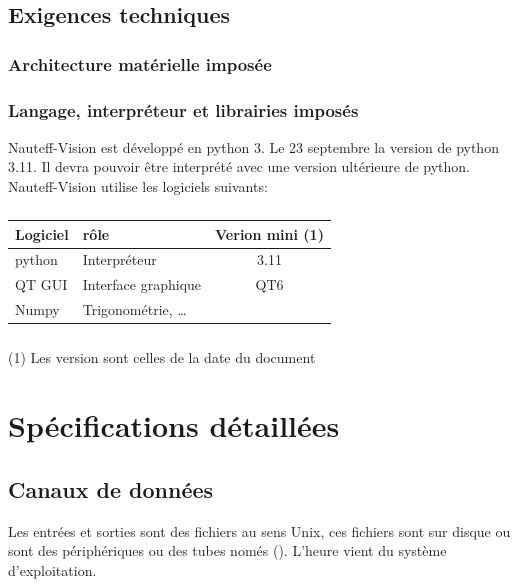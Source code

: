 \documentclass[a4paper,11pt]{report}
\begin{document}
\section{Exigences techniques}
\subsection{Architecture matérielle imposée}
\subsection{Langage, interpréteur et librairies imposés}
Nauteff-Vision est développé en python 3.
Le 23 septembre la version de python 3.11.
Il devra pouvoir être interprété
avec une version ultérieure de python. 
Nauteff-Vision utilise les logiciels suivants:
\paragraph{}

\begin{tabular}{l|l|c}
        Logiciel & rôle & Verion mini (1)\\
        \hline
        python & Interpréteur & 3.11 \\
        QT GUI & Interface graphique & QT6\\
        Numpy & Trigonométrie, \ldots   & \\
\end{tabular}
\paragraph{}

(1) Les version sont celles de la date du document

\chapter{Spécifications détaillées}

\section{Canaux de données}

Les entrées et sorties sont des fichiers au sens Unix, ces fichiers
sont sur disque ou sont des périphériques ou des tubes només ().
L'heure vient du système d'exploitation.
\end{document}
